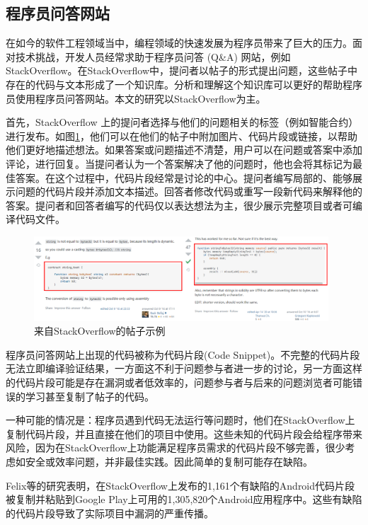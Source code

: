 \subsection{程序员问答网站}

在如今的软件工程领域当中，编程领域的快速发展为程序员带来了巨大的压力。面对技术挑战，开发人员经常求助于程序员问答 (Q\&A) 网站，例如 StackOverflow。在StackOverflow中，提问者以帖子的形式提出问题，这些帖子中存在的代码与文本形成了一个知识库。分析和理解这个知识库可以更好的帮助程序员使用程序员问答网站。本文的研究以StackOverflow为主。

首先，StackOverflow 上的提问者选择与他们的问题相关的标签（例如智能合约）进行发布。如图\ref{intro}，他们可以在他们的帖子中附加图片、代码片段或链接，以帮助他们更好地描述想法。如果答案或问题描述不清楚，用户可以在问题或答案中添加评论，进行回复。当提问者认为一个答案解决了他的问题时，他也会将其标记为最佳答案。在这个过程中，代码片段经常是讨论的中心。提问者编写局部的、能够展示问题的代码片段并添加文本描述。回答者修改代码或重写一段新代码来解释他的答案。提问者和回答者编写的代码仅以表达想法为主，很少展示完整项目或者可编译代码文件。

\begin{figure}[htbp]
\centering
\includegraphics[width=0.98\textwidth]{figures/intro.eps}
\caption{来自StackOverflow的帖子示例}
\label{intro}
\end{figure}

程序员问答网站上出现的代码被称为代码片段(Code Snippet)。不完整的代码片段无法立即编译验证结果，一方面这不利于问题参与者进一步的讨论，另一方面这样的代码片段可能是存在漏洞或者低效率的，问题参与者与后来的问题浏览者可能错误的学习甚至复制了帖子的代码。

一种可能的情况是：程序员遇到代码无法运行等问题时，他们在StackOverflow上复制代码片段，并且直接在他们的项目中使用。这些未知的代码片段会给程序带来风险，因为在StackOverflow上功能满足程序员需求的代码片段不够完善，很少考虑如安全或效率问题，并非最佳实践。因此简单的复制可能存在缺陷。

Felix等的研究\cite{fisher1}表明，在StackOverflow上发布的1,161个有缺陷的Android代码片段被复制并粘贴到Google Play上可用的1,305,820个Android应用程序中。这些有缺陷的代码片段导致了实际项目中漏洞的严重传播。

